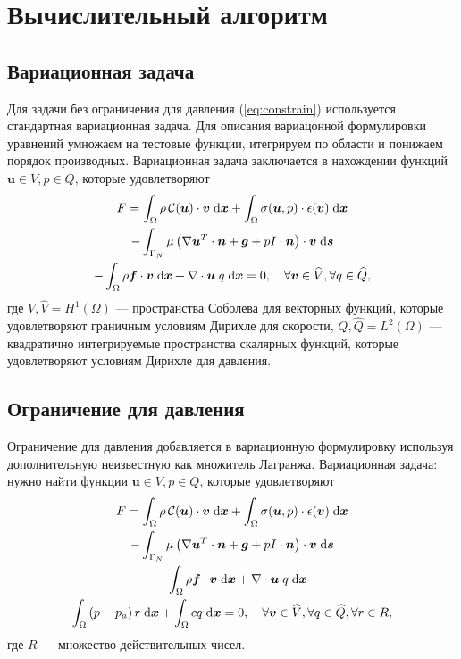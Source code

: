 \documentclass[a4paper,10pt]{report}
\begin{document}
\section{Вычислительный алгоритм}

\subsection{Вариационная задача}

Для задачи без ограничения для давления (\ref{eq:constrain})  используется стандартная вариационная задача. 
Для описания вариацонной формулировки уравнений умножаем на тестовые функции, итегрируем по области и понижаем порядок производных. Вариационная задача заключается в нахождении функций $\bm{u} \in V, p \in Q$, которые удовлетворяют
\begin{equation}
\begin{gathered}
F = \int_\Omega \rho \,\mathcal{C}(\bm{u}) \cdot \bm{v} \;{\rm d}\bm{x} 
 + \int_\Omega \sigma(\bm{u}, p) \cdot \epsilon(\bm{v}) \;{\rm d}\bm{x} \\
 - \int_{\Gamma_N} \mu \left(\nabla \bm{u}^T \cdot \bm{n} + \bm{g} + pI \cdot \bm{n} \right) \cdot \bm{v} \;{\rm d}\bm{s} \\
 - \int_\Omega \rho \bm{f} \cdot \bm{v} \;{\rm d}\bm{x} 
 + \nabla \cdot \bm{u} \; q \;{\rm d}\bm{x} = 0, \quad \forall \bm{v} \in \widehat{V}, \forall q \in \widehat{Q},
\end{gathered}
\label{eq:nonlinear-form}
\end{equation}
где $V, \widehat{V} = H^1(\Omega)$ --- пространства Соболева для векторных функций, которые удовлетворяют граничным условиям Дирихле для скорости, $Q, \widehat{Q} = L^2(\Omega)$ ---  квадратично интегрируемые пространства скалярных функций, которые удовлетворяют условиям Дирихле для давления.

\subsection{Ограничение для давления}

Ограничение для давления добавляется в вариационную формулировку используя дополнительную неизвестную как множитель Лагранжа. Вариационная задача: нужно найти функции $\bm{u} \in V, p \in Q$, которые удовлетворяют
\begin{equation}
\begin{gathered}
F = \int_\Omega \rho \,\mathcal{C}(\bm{u}) \cdot \bm{v} \;{\rm d}\bm{x} 
 + \int_\Omega \sigma(\bm{u}, p) \cdot \epsilon(\bm{v}) \;{\rm d}\bm{x} \\
 - \int_{\Gamma_N} \mu \left(\nabla \bm{u}^T \cdot \bm{n} + \bm{g} + pI \cdot \bm{n} \right) \cdot \bm{v} \;{\rm d}\bm{s} \\
 - \int_\Omega \rho \bm{f} \cdot \bm{v} \;{\rm d}\bm{x} 
 + \nabla \cdot \bm{u} \; q \;{\rm d}\bm{x} \\
 \int_\Omega \left(p - p_a\right) r \;{\rm d}\bm{x} + \int_\Omega c q \;{\rm d}\bm{x} = 0, \quad \forall \bm{v} \in \widehat{V}, \forall q \in \widehat{Q}, \forall r \in R,
\end{gathered}
\label{eq:nonlinear-form-constrained}
\end{equation}
где $R$ --- множество действительных чисел.
\end{document}
